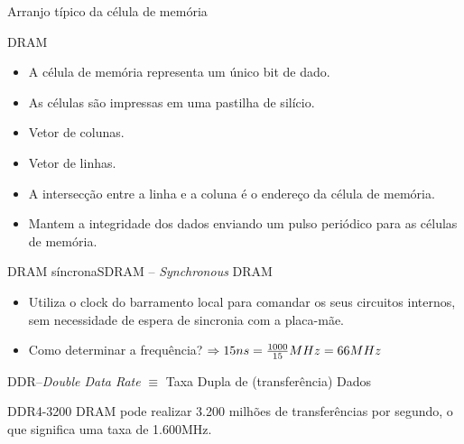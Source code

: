 \begin{frame}{Arranjo típico da célula de memória}
  \def\R{0.2}
\centering
{}
\end{frame}

\begin{frame}{DRAM}
  \begin{itemize}[<+-| alert@+>]
  \item A célula de memória representa um único bit de dado.
  \item As células são impressas em uma pastilha de silício.
  \item Vetor de colunas.
  \item Vetor de linhas.
  \item A intersecção entre a linha e a coluna é o endereço 
    da célula de memória.
  \item Mantem a integridade dos dados enviando um pulso  
    periódico para as células de memória.
  \end{itemize}  
\end{frame}

\begin{frame}{DRAM síncrona}{SDRAM -- {\em Synchronous} DRAM}
  \begin{itemize}
  \item Utiliza o clock do barramento local para comandar os seus
    circuitos internos, sem necessidade de espera de sincronia com a
    placa-mãe.
  \item Como determinar a frequência?
    $\Rightarrow 15 ns =  {1000\over{15}} MHz = 66 MHz$
  \end{itemize}

\pause\bigskip\small
\noindent DDR--\emph{Double Data Rate} $\equiv$ Taxa Dupla de (transferência) Dados\\\bigskip

DDR4-3200 DRAM pode realizar 3.200 milhões de transferências por segundo, 
o que significa uma taxa de 1.600MHz.

\end{frame}


